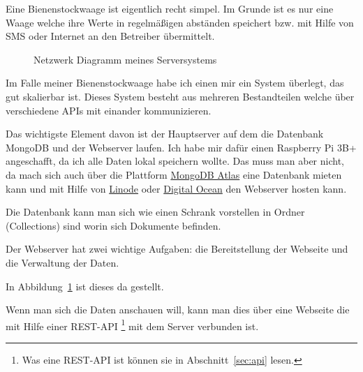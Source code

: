 \documentclass[ngerman,12pt]{scrartcl}
\begin{document}
Eine Bienenstockwaage ist eigentlich recht simpel.
Im Grunde ist es nur eine Waage welche ihre Werte in regelmäßigen abständen speichert bzw.
mit Hilfe von SMS oder Internet an den Betreiber übermittelt.

\begin{figure}[ht]
	\centering
	\caption{Netzwerk Diagramm meines Serversystems\label{abb:networkdiagram}}
\end{figure}

Im Falle meiner Bienenstockwaage habe ich einen mir ein System überlegt, das gut skalierbar ist.
Dieses System besteht aus mehreren Bestandteilen welche über verschiedene APIs mit einander kommunizieren.

Das wichtigste Element davon ist der Hauptserver auf dem die Datenbank MongoDB und der Webserver laufen.
Ich habe mir dafür einen Raspberry Pi 3B+ angeschafft, da ich alle Daten lokal speichern wollte.
Das muss man aber nicht, da mach sich auch über die Plattform \href{https://www.mongodb.com/cloud/atlas}{MongoDB Atlas} eine Datenbank mieten kann und mit Hilfe von \href{https://www.linode.com}{Linode} oder \href{https://www.digitalocean.com/}{Digital Ocean} den Webserver hosten kann.

Die Datenbank kann man sich wie einen Schrank vorstellen in Ordner (Collections) sind worin sich Dokumente befinden.

Der Webserver hat zwei wichtige Aufgaben:
die Bereitstellung der Webseite und die Verwaltung der Daten.

In Abbildung~\ref{abb:networkdiagram} ist dieses da gestellt.


Wenn man sich die Daten anschauen will, kann man dies über eine Webseite die mit Hilfe einer REST-API
\footnote{Was eine REST-API ist können sie in Abschnitt~\ref{sec:api} lesen.}
mit dem Server verbunden ist.

\printbibliography{}
\end{document}
